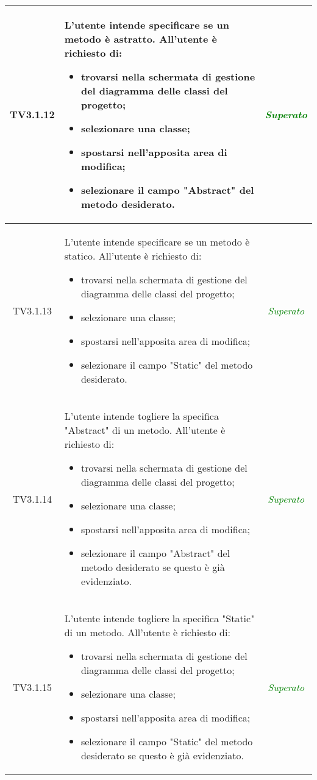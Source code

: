 \begin{longtable}{|c|>{}m{8cm}|c|}
\hypertarget{TV3.1.12}{TV3.1.12} & L'utente intende specificare se un metodo è astratto.
All'utente è richiesto di:
\begin{itemize}
	\item trovarsi nella schermata di gestione del diagramma delle classi del progetto;
	\item selezionare una classe;
	\item spostarsi nell'apposita area di modifica;
	\item selezionare il campo "Abstract" del metodo desiderato.
\end{itemize} & \textcolor{Green}{\textit{Superato}}\\ \hline

\hypertarget{TV3.1.13}{TV3.1.13} & L'utente intende specificare se un metodo è statico.
All'utente è richiesto di:
\begin{itemize}
	\item trovarsi nella schermata di gestione del diagramma delle classi del progetto;
	\item selezionare una classe;
	\item spostarsi nell'apposita area di modifica;
	\item selezionare il campo "Static" del metodo desiderato.
\end{itemize} & \textcolor{Green}{\textit{Superato}}\\ \hline

\hypertarget{TV3.1.14}{TV3.1.14} & L'utente intende togliere la specifica "Abstract" di un metodo.
All'utente è richiesto di:
\begin{itemize}
	\item trovarsi nella schermata di gestione del diagramma delle classi del progetto;
	\item selezionare una classe;
	\item spostarsi nell'apposita area di modifica;
	\item selezionare il campo "Abstract" del metodo desiderato se questo è già evidenziato.
\end{itemize} & \textcolor{Green}{\textit{Superato}}\\ \hline

\hypertarget{TV3.1.15}{TV3.1.15} & L'utente intende togliere la specifica "Static" di un metodo.
All'utente è richiesto di:
\begin{itemize}
	\item trovarsi nella schermata di gestione del diagramma delle classi del progetto;
	\item selezionare una classe;
	\item spostarsi nell'apposita area di modifica;
	\item selezionare il campo "Static" del metodo desiderato se questo è già evidenziato.
\end{itemize} & \textcolor{Green}{\textit{Superato}}\\ \hline


\end{longtable}
